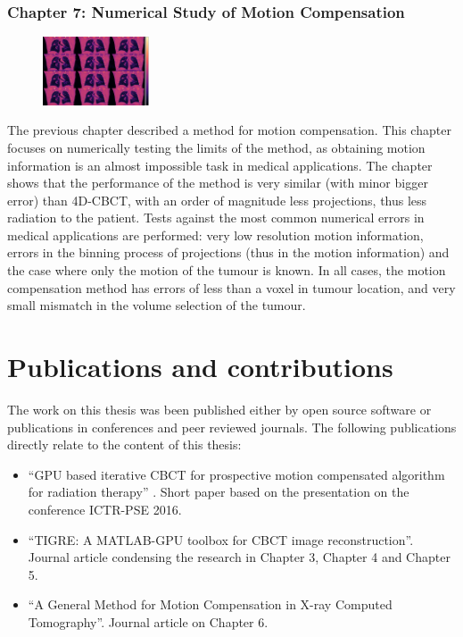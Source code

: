 \subsubsection{Chapter 7: Numerical Study of Motion Compensation}

\begin{figure}
\centering
\includegraphics[width=0.28\textwidth]{accuracyMC/4DCBCT3stage.png}
\end{figure}

The previous chapter described a method for motion compensation. This chapter focuses on numerically testing the limits of the method, as obtaining motion information is an almost impossible task in medical applications. The chapter shows that the performance of the method is very similar (with minor bigger error) than 4D-CBCT, with an order of magnitude less projections, thus less radiation to the patient. Tests against the most common numerical errors in medical applications are performed: very low resolution motion information, errors in the binning process of projections (thus in the motion information) and the case where only the motion of the tumour is known. In all cases, the motion compensation method has errors of less than a voxel in tumour location, and very small mismatch in the volume selection of the tumour.
\FloatBarrier
\section{Publications and contributions}

The work on this thesis was been published either by open source software or publications in conferences and peer reviewed journals. The following publications directly relate to the content of this thesis:

\begin{itemize}
\item ``GPU based iterative CBCT for prospective motion compensated algorithm for radiation therapy''\cite{biguri2016gpu} . Short paper based on the presentation on the conference ICTR-PSE 2016.
\item ``TIGRE: A MATLAB-GPU toolbox for CBCT image reconstruction''\cite{TIGRE}. Journal article condensing the research in Chapter 3, Chapter 4 and Chapter 5.
\item  ``A General Method for Motion Compensation in X-ray Computed Tomography''\cite{biguri2017general}. Journal article on Chapter 6.
\end{itemize}

